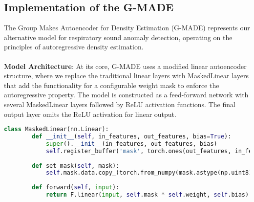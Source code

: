 \subsection{Implementation of the G-MADE}
The Group Makes Autoencoder for Density Estimation (G-MADE) represents our alternative model for respiratory sound anomaly detection, operating on the principles of autoregressive density estimation.\\\\
\textbf{Model Architecture}: At its core, G-MADE uses a modified linear autoencoder structure, where we replace the traditional linear layers with MaskedLinear layers that add the functionality for a configurable weight mask to enforce the autoregressive property. The model is constructed as a feed-forward network with several MaskedLinear layers followed by ReLU activation functions. The final output layer omits the ReLU activation for linear output.
\begin{lstlisting}[language=Python,caption={MaskedLinear PyTorch implementation as described by Karpathy, Andrej (2018)~\cite{githubMADE}}]
    class MaskedLinear(nn.Linear):    
        def __init__(self, in_features, out_features, bias=True):
            super().__init__(in_features, out_features, bias)        
            self.register_buffer('mask', torch.ones(out_features, in_features))
        
        def set_mask(self, mask):
            self.mask.data.copy_(torch.from_numpy(mask.astype(np.uint8).T))
            
        def forward(self, input):
            return F.linear(input, self.mask * self.weight, self.bias)
\end{lstlisting}

